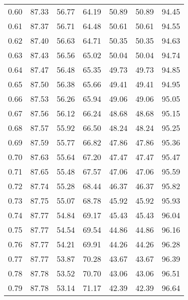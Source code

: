 \begin{tabular}{|c|c|c|c|c|c|c|}
      0.60 &     87.33 &     56.77 &      64.19 &   50.89 &      50.89 &         94.45 \\
      0.61 &     87.37 &     56.71 &      64.48 &   50.61 &      50.61 &         94.55 \\
      0.62 &     87.40 &     56.63 &      64.71 &   50.35 &      50.35 &         94.63 \\
      0.63 &     87.43 &     56.56 &      65.02 &   50.04 &      50.04 &         94.74 \\
      0.64 &     87.47 &     56.48 &      65.35 &   49.73 &      49.73 &         94.85 \\
      0.65 &     87.50 &     56.38 &      65.66 &   49.41 &      49.41 &         94.95 \\
      0.66 &     87.53 &     56.26 &      65.94 &   49.06 &      49.06 &         95.05 \\
      0.67 &     87.56 &     56.12 &      66.24 &   48.68 &      48.68 &         95.15 \\
      0.68 &     87.57 &     55.92 &      66.50 &   48.24 &      48.24 &         95.25 \\
      0.69 &     87.59 &     55.77 &      66.82 &   47.86 &      47.86 &         95.36 \\
      0.70 &     87.63 &     55.64 &      67.20 &   47.47 &      47.47 &         95.47 \\
      0.71 &     87.65 &     55.48 &      67.57 &   47.06 &      47.06 &         95.59 \\
      0.72 &     87.74 &     55.28 &      68.44 &   46.37 &      46.37 &         95.82 \\
      0.73 &     87.75 &     55.07 &      68.78 &   45.92 &      45.92 &         95.93 \\
      0.74 &     87.77 &     54.84 &      69.17 &   45.43 &      45.43 &         96.04 \\
      0.75 &     87.77 &     54.54 &      69.54 &   44.86 &      44.86 &         96.16 \\
      0.76 &     87.77 &     54.21 &      69.91 &   44.26 &      44.26 &         96.28 \\
      0.77 &     87.77 &     53.87 &      70.28 &   43.67 &      43.67 &         96.39 \\
      0.78 &     87.78 &     53.52 &      70.70 &   43.06 &      43.06 &         96.51 \\
      0.79 &     87.78 &     53.14 &      71.17 &   42.39 &      42.39 &         96.64 \\

\end{tabular}
